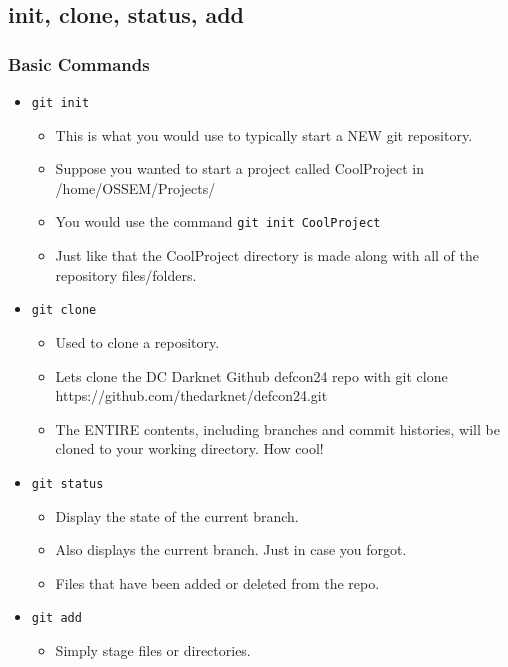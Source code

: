 \documentclass{beamer}
\begin{document}
\subsection{init, clone, status, add}
\begin{frame}
    \frametitle{Basic Commands}
    \begin{itemize}

        \item{\texttt{git init}}
        \begin{itemize}
            \item{This is what you would use to typically start a NEW git repository.}
            \item{Suppose you wanted to start a project called CoolProject in /home/OSSEM/Projects/}
            \item{You would use the command \texttt{git init CoolProject}}
            \item{Just like that the CoolProject directory is made along with all of the repository files/folders.}
        \end{itemize}

    \item{\texttt{git clone}}
        \begin{itemize}
            \item{Used to clone a repository.}
            \item{Lets clone the DC Darknet Github defcon24 repo with git clone https://github.com/thedarknet/defcon24.git}
            \item{The ENTIRE contents, including branches and commit histories, will be cloned to your working directory. How cool!}
        \end{itemize}
        
    \item{\texttt{git status}}
        \begin{itemize}
            \item{Display the state of the current branch.}
            \item{Also displays the current branch. Just in case you forgot.}
            \item{Files that have been added or deleted from the repo.}
        \end{itemize}

    \item{\texttt{git add}}
        \begin{itemize}
            \item{Simply stage files or directories.}
        \end{itemize}

    \end{itemize}
\end{frame}
\end{document}
